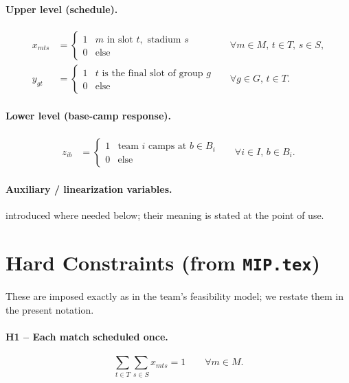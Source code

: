 \documentclass[12pt, letterpaper]{article}
\begin{document}
\paragraph{Upper level (schedule).}
\begin{align}
x_{mts} &=
  \begin{cases} 1 & m \text{ in slot } t,\text{ stadium } s\\ 0 &
  \text{else}\end{cases}
  &&\forall m\in M,\,t\in T,\,s\in S,\\
y_{gt} &=
  \begin{cases} 1 & t \text{ is the final slot of group } g\\ 0 &
  \text{else}\end{cases}
  &&\forall g\in G,\,t\in T.
\end{align}

\paragraph{Lower level (base-camp response).}
\begin{align}
z_{ib} &=
  \begin{cases} 1 & \text{team } i \text{ camps at } b\in B_i\\ 0 &
  \text{else}\end{cases}
  &&\forall i\in I,\,b\in B_i.
\end{align}

\paragraph{Auxiliary / linearization variables.}
introduced where needed below; their meaning is stated at the point of
use.

\section{Hard Constraints (from \texttt{MIP.tex})}

These are imposed exactly as in the team's feasibility model; we restate
them in the present notation.

\paragraph{H1 -- Each match scheduled once.}
\begin{equation}
\sum_{t\in T}\sum_{s\in S} x_{mts}=1 \qquad\forall m\in M.
\end{equation}
\end{document}
